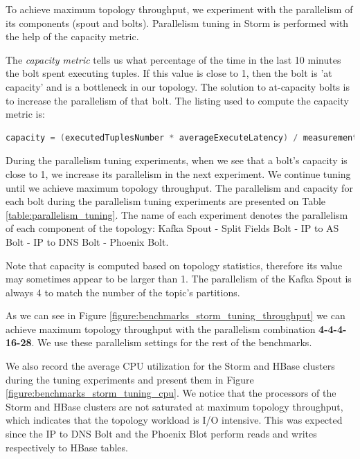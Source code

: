 To achieve maximum topology throughput, we experiment with the parallelism of its components (spout and bolts). Parallelism tuning in Storm is performed with the help of the capacity metric. 

The \emph{capacity metric} tells us what percentage of the time in the last 10 minutes the bolt spent executing tuples. If this value is close to 1, then the bolt is 'at capacity' and is a bottleneck in our topology. The solution to at-capacity bolts is to increase the parallelism of that bolt. The listing used to compute the capacity metric is:

\begin{lstlisting}[language=C,frame=none]
capacity = (executedTuplesNumber * averageExecuteLatency) / measurementTime
\end{lstlisting}

During the parallelism tuning experiments, when we see that a bolt's capacity is close to 1, we increase its parallelism in the next experiment. We continue tuning until we achieve maximum topology throughput. The parallelism and capacity for each bolt during the parallelism tuning experiments are presented on Table \ref{table:parallelism_tuning}. The name of each experiment denotes the parallelism of each component of the topology: Kafka Spout - Split Fields Bolt - IP to AS Bolt - IP to DNS Bolt - Phoenix Bolt.

Note that capacity is computed based on topology statistics, therefore its value may sometimes appear to be larger than 1. The parallelism of the Kafka Spout is always 4 to match the number of the topic's partitions.

As we can see in Figure \ref{figure:benchmarks_storm_tuning_throughput} we can achieve maximum topology throughput with the parallelism combination \textbf{4-4-4-16-28}. We use these parallelism settings for the rest of the benchmarks.

We also record the average CPU utilization for the Storm and HBase clusters during the tuning experiments and present them in Figure \ref{figure:benchmarks_storm_tuning_cpu}. We notice that the processors of the Storm and HBase clusters are not saturated at maximum topology throughput, which indicates that the topology workload is I/O intensive. This was expected since the IP to DNS Bolt and the Phoenix Blot perform reads and writes respectively to HBase tables.

